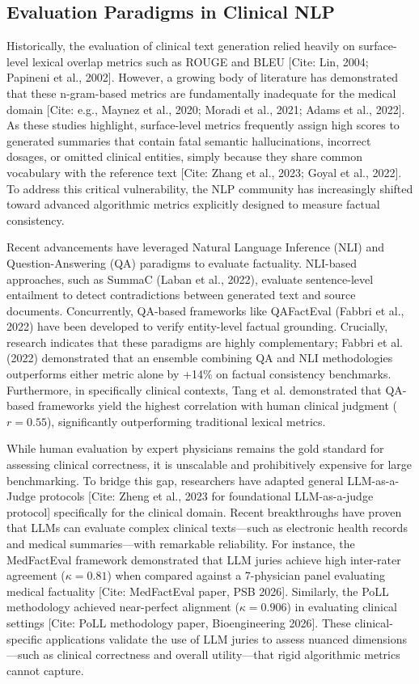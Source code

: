 \documentclass[11pt]{article}
\begin{document}
\subsection{Evaluation Paradigms in Clinical NLP}

Historically, the evaluation of clinical text generation relied heavily on surface-level lexical overlap metrics such as ROUGE and BLEU [Cite: Lin, 2004; Papineni et al., 2002]. However, a growing body of literature has demonstrated that these n-gram-based metrics are fundamentally inadequate for the medical domain [Cite: e.g., Maynez et al., 2020; Moradi et al., 2021; Adams et al., 2022]. As these studies highlight, surface-level metrics frequently assign high scores to generated summaries that contain fatal semantic hallucinations, incorrect dosages, or omitted clinical entities, simply because they share common vocabulary with the reference text [Cite: Zhang et al., 2023; Goyal et al., 2022]. To address this critical vulnerability, the NLP community has increasingly shifted toward advanced algorithmic metrics explicitly designed to measure factual consistency.

Recent advancements have leveraged Natural Language Inference (NLI) and Question-Answering (QA) paradigms to evaluate factuality. NLI-based approaches, such as SummaC (Laban et al., 2022), evaluate sentence-level entailment to detect contradictions between generated text and source documents. Concurrently, QA-based frameworks like QAFactEval (Fabbri et al., 2022) have been developed to verify entity-level factual grounding. Crucially, research indicates that these paradigms are highly complementary; Fabbri et al. (2022) demonstrated that an ensemble combining QA and NLI methodologies outperforms either metric alone by +14\% on factual consistency benchmarks. Furthermore, in specifically clinical contexts, Tang et al. demonstrated that QA-based frameworks yield the highest correlation with human clinical judgment ($r = 0.55$), significantly outperforming traditional lexical metrics.

While human evaluation by expert physicians remains the gold standard for assessing clinical correctness, it is unscalable and prohibitively expensive for large benchmarking. To bridge this gap, researchers have adapted general LLM-as-a-Judge protocols [Cite: Zheng et al., 2023 for foundational LLM-as-a-judge protocol] specifically for the clinical domain. Recent breakthroughs have proven that LLMs can evaluate complex clinical texts—such as electronic health records and medical summaries—with remarkable reliability. For instance, the MedFactEval framework demonstrated that LLM juries achieve high inter-rater agreement ($\kappa=0.81$) when compared against a 7-physician panel evaluating medical factuality [Cite: MedFactEval paper, PSB 2026]. Similarly, the PoLL methodology achieved near-perfect alignment ($\kappa=0.906$) in evaluating clinical settings [Cite: PoLL methodology paper, Bioengineering 2026]. These clinical-specific applications validate the use of LLM juries to assess nuanced dimensions—such as clinical correctness and overall utility—that rigid algorithmic metrics cannot capture. 
\end{document}
